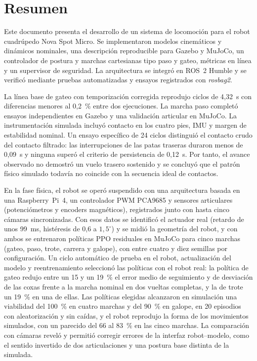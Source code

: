 \chapter*{Resumen}

Este documento presenta el desarrollo de un sistema de locomoción para el
robot cuadrúpedo Nova Spot Micro. Se implementaron modelos cinemáticos y
dinámicos nominales, una descripción reproducible para Gazebo y MuJoCo, un
controlador de postura y marchas cartesianas tipo paso y gateo, métricas en
línea y un supervisor de seguridad. La arquitectura se integró en ROS~2 Humble
y se verificó mediante pruebas automatizadas y ensayos registrados con
\textit{rosbag2}.

La línea base de gateo con temporización corregida reprodujo ciclos de
4,32~s con diferencias menores al 0,2~\% entre dos ejecuciones. La marcha paso
completó ensayos independientes en Gazebo y una validación articular en MuJoCo.
La instrumentación simulada incluyó contacto en los cuatro pies, IMU y margen
de estabilidad nominal. Un ensayo específico de 24 ciclos distinguió el
contacto crudo del contacto filtrado: las interrupciones de las patas traseras
duraron menos de 0,09~s y ninguna superó el criterio de persistencia de
0,12~s. Por tanto, el avance observado no demostró un vuelo trasero sostenido y
se concluyó que el patrón físico simulado todavía no coincide con la secuencia
ideal de contactos.

En la fase física, el robot se operó suspendido con una arquitectura basada en
una Raspberry~Pi~4, un controlador PWM PCA9685 y sensores articulares
(potenciómetros y encoders magnéticos), registrados junto con hasta cinco
cámaras sincronizadas.
Con esos datos se identificó el actuador real (retardo de unos 99~ms,
histéresis de 0,6 a $1{,}5^\circ$) y se midió la geometría del robot, y con
ambos se entrenaron políticas PPO residuales en MuJoCo para cinco marchas (gateo,
paso, trote, carrera y galope), con entre cuatro y diez semillas por configuración. Un ciclo automático
de prueba en el robot, actualización del modelo y reentrenamiento seleccionó las
políticas con el robot real: la política de gateo redujo entre un 15 y un 19~\%
el error medio de seguimiento y de desviación de las coxas frente a la marcha
nominal en dos vueltas completas, y la de trote un 19~\% en una de ellas. Las
políticas elegidas alcanzaron en simulación una viabilidad del 100~\% en cuatro marchas
y del 90~\% en galope, en 20 episodios con aleatorización y sin caídas, y el robot
reprodujo la forma de los movimientos simulados, con un parecido del 66 al 83~\% en las
cinco marchas. La
comparación con cámaras reveló y permitió corregir errores de la interfaz
robot--modelo, como el sentido invertido de dos articulaciones y una postura
base distinta de la simulada.

